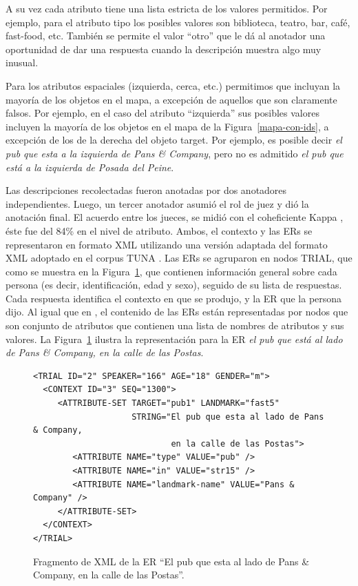A su vez cada atributo tiene una lista estricta de los valores permitidos. Por ejemplo, para el atributo tipo los posibles valores son biblioteca, teatro, bar, caf\'e, fast-food, etc. Tambi\'en se permite el valor ``otro'' que le d\'a al anotador una oportunidad de dar una respuesta cuando la descripci\'on muestra algo muy inusual.

Para los atributos espaciales (izquierda, cerca, etc.) permitimos que incluyan la mayor\'{i}a de los objetos en el mapa, a excepci\'on de aquellos que son claramente falsos. Por ejemplo, en el caso del atributo ``izquierda'' sus posibles valores incluyen la mayor\'{i}a de los objetos en el mapa de la Figura~\ref{mapa-con-ids}, a excepci\'on de los de la derecha del objeto target. Por ejemplo, es posible decir {\it el pub que esta a la izquierda de Pans \& Company}, pero no es admitido {\it el pub que est\'a a la izquierda de Posada del Peine}.

Las descripciones recolectadas fueron anotadas por dos anotadores independientes. Luego, un tercer anotador asumi\'o el rol de juez y di\'o la anotaci\'on final. El acuerdo entre los jueces, se midi\'o con el coheficiente Kappa \cite{kappa}, \'este fue del 84\% en el nivel de atributo.
Ambos, el contexto y las ERs se representaron en formato XML utilizando una versi\'on adaptada del formato XML adoptado en el corpus TUNA \cite{tuna-corpus}. Las ERs se agruparon en nodos TRIAL, que como se muestra en la Figura~\ref{xml}, que contienen informaci\'on general sobre cada persona (es decir, identificaci\'on, edad y sexo), seguido de su lista de respuestas. Cada respuesta identifica el contexto en que se produjo, y la ER que la persona dijo.
Al igual que en \cite{tuna-corpus}, el contenido de las ERs est\'an representadas por nodos que son conjunto de atributos que contienen una lista de nombres de atributos y sus valores. La Figura~\ref{xml} ilustra la representaci\'on para la ER {\it el pub que est\'a al lado de Pans \& Company, en la
calle de las Postas}.
\begin{figure}
\begin{verbatim}
<TRIAL ID="2" SPEAKER="166" AGE="18" GENDER="m">
  <CONTEXT ID="3" SEQ="1300">
     <ATTRIBUTE-SET TARGET="pub1" LANDMARK="fast5" 
                    STRING="El pub que esta al lado de Pans & Company, 
                            en la calle de las Postas">
        <ATTRIBUTE NAME="type" VALUE="pub" />
        <ATTRIBUTE NAME="in" VALUE="str15" />
        <ATTRIBUTE NAME="landmark-name" VALUE="Pans & Company" />
     </ATTRIBUTE-SET>
  </CONTEXT>
</TRIAL>	
\end{verbatim}
\caption{Fragmento de XML de la ER ``El pub que esta al lado de Pans \& Company, en la calle de las Postas''.}\label{xml}
\end{figure}


